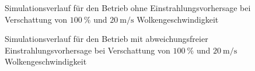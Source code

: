 \begin{figure}[h!]
    \centering
    \setlength{\fboxsep}{1pt}
    \setlength{\fboxrule}{1pt}
    \caption[Simulationsverlauf für den Betrieb ohne Einstrahlungsvorhersage bei Verschattung von $\SI{100}{\percent}$ und $\SI{20}{\metre\per\second}$ Wolkengeschwindigkeit]{Simulationsverlauf für den Betrieb ohne Einstrahlungsvorhersage bei Verschattung von $\SI{100}{\percent}$ und $\SI{20}{\metre\per\second}$ Wolkengeschwindigkeit}
    \label{fig_unwissend0020}
\end{figure}

\begin{figure}[h!]
    \centering
    \setlength{\fboxsep}{1pt}
    \setlength{\fboxrule}{1pt}
    \caption[Simulationsverlauf für den Betrieb mit abweichungsfreier Einstrahlungsvorhersage bei Verschattung von $\SI{100}{\percent}$ und $\SI{20}{\metre\per\second}$ Wolkengeschwindigkeit]{Simulationsverlauf für den Betrieb mit abweichungsfreier Einstrahlungsvorhersage bei Verschattung von $\SI{100}{\percent}$ und $\SI{20}{\metre\per\second}$ Wolkengeschwindigkeit}
    \label{fig_allwissend0020}
\end{figure}

